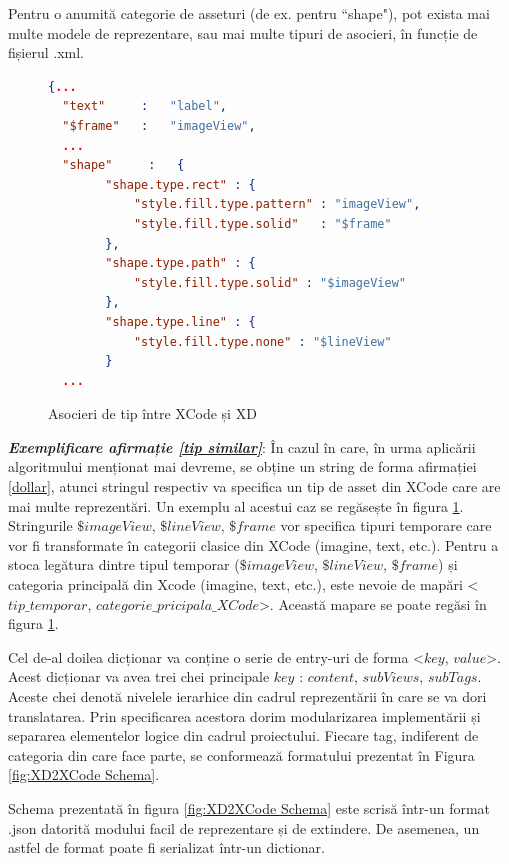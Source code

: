 \begin{myNote}\label{tip similar}

Pentru o anumită categorie de asseturi (de ex. pentru ``shape"), pot exista mai multe modele de reprezentare, sau mai multe tipuri de asocieri, în funcție de fișierul .xml.
\end{myNote}

\begin{figure}[!htbp]
\begin{lstlisting}[language=json,firstnumber=1]
  {...
  "text"     :   "label",
  "$frame"   :   "imageView",
  ...
  "shape"     :   {
        "shape.type.rect" : {
            "style.fill.type.pattern" : "imageView",
            "style.fill.type.solid"   : "$frame"
        },
        "shape.type.path" : {
            "style.fill.type.solid" : "$imageView"
        },
        "shape.type.line" : {
            "style.fill.type.none" : "$lineView"
        }
  ...
\end{lstlisting}
\caption{Asocieri de tip între XCode și XD} \label{fig:XD2XCode Defs}
\end{figure}

\textbf{\textit{Exemplificare afirmație \ref{tip similar}}}: În cazul în care, în urma aplicării algoritmului menționat mai devreme, se obține un string de forma afirmației \ref{dollar}, atunci stringul respectiv va specifica un tip de asset din XCode care are mai multe reprezentări. Un exemplu al acestui caz se regăsește în figura \ref{fig:XD2XCode Defs}. Stringurile $\$imageView$, $\$lineView$, $\$frame$ vor specifica tipuri temporare care vor fi transformate în categorii clasice din XCode (imagine, text, etc.). Pentru a stoca legătura dintre tipul temporar ($\$imageView$, $\$lineView$, $\$frame$) și categoria principală din Xcode (imagine, text, etc.), este nevoie de mapări <$tip\_temporar$, $categorie\_pricipala\_XCode$>. Această mapare se poate regăsi în figura \ref{fig:XD2XCode Defs}.

Cel de-al doilea dicționar va conține o serie de entry-uri de forma <$key$, $value$>. Acest dicționar va avea trei chei principale $key$ : $content$, $subViews$, $subTags$. Aceste chei denotă nivelele ierarhice din cadrul reprezentării în care se va dori translatarea. Prin specificarea acestora dorim modularizarea implementării și separarea elementelor logice din cadrul proiectului. Fiecare tag, indiferent de categoria din care face parte, se conformează formatului prezentat în Figura \ref{fig:XD2XCode Schema}.


Schema prezentată în figura \ref{fig:XD2XCode Schema} este scrisă într-un format .json datorită modului facil de reprezentare și de extindere. De asemenea, un astfel de format poate fi serializat într-un dictionar. 

